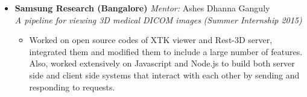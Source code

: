 \documentclass[9pt]{article}
\newenvironment{changemargin}[2]{%
  \begin{list}{}{%
    \setlength{\topsep}{0pt}%
    \setlength{\leftmargin}{0pt}%
    \setlength{\rightmargin}{#2}%
    \setlength{\listparindent}{\parindent}%
    \setlength{\itemindent}{\parindent}%
    \setlength{\parsep}{\parskip}%
  }%
  \item[]}{\end{list}
}
\newenvironment{body} {
	\vspace*{-16pt}
	\begin{changemargin}{-0.25in}{-0.5in}
  }	
	{\end{changemargin}
}
\begin{document}
\begin{body}
\begin{itemize}
	  \smallskip
          \item \textbf{Samsung Research (Bangalore)} \hfill{} \textit{Mentor:} Ashes Dhanna Ganguly \\ \textit{A pipeline for viewing 3D medical DICOM images} \hfill{} \emph{  (Summer Internship 2015)}\\
          \begin{itemize} 
              \item Worked on open source codes of XTK viewer and Rest-3D server, integrated them and
modified them to include a large number of features. Also, worked extensively on Javascript and Node.js to build both server side and client side systems that
interact with each other by sending and responding to requests.
          \end{itemize} 
	  \smallskip
\end{itemize}          
\end{body}

\smallskip
\end{document}
